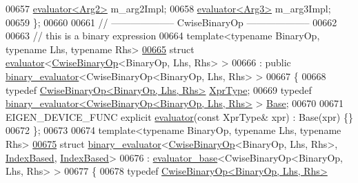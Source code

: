 \begin{DoxyCode}
00657   \hyperlink{struct_eigen_1_1internal_1_1evaluator}{evaluator<Arg2>} m\_arg2Impl;
00658   \hyperlink{struct_eigen_1_1internal_1_1evaluator}{evaluator<Arg3>} m\_arg3Impl;
00659 \};
00660 
00661 \textcolor{comment}{// -------------------- CwiseBinaryOp --------------------}
00662 
00663 \textcolor{comment}{// this is a binary expression}
00664 \textcolor{keyword}{template}<\textcolor{keyword}{typename} BinaryOp, \textcolor{keyword}{typename} Lhs, \textcolor{keyword}{typename} Rhs>
\hyperlink{struct_eigen_1_1internal_1_1evaluator_3_01_cwise_binary_op_3_01_binary_op_00_01_lhs_00_01_rhs_01_4_01_4}{00665} \textcolor{keyword}{struct }\hyperlink{struct_eigen_1_1internal_1_1evaluator}{evaluator}<\hyperlink{group___core___module_class_eigen_1_1_cwise_binary_op}{CwiseBinaryOp}<BinaryOp, Lhs, Rhs> >
00666   : \textcolor{keyword}{public} \hyperlink{struct_eigen_1_1internal_1_1binary__evaluator}{binary\_evaluator}<CwiseBinaryOp<BinaryOp, Lhs, Rhs> >
00667 \{
00668   \textcolor{keyword}{typedef} \hyperlink{group___core___module_class_eigen_1_1_cwise_binary_op}{CwiseBinaryOp<BinaryOp, Lhs, Rhs>} 
      \hyperlink{group___core___module_class_eigen_1_1_cwise_binary_op}{XprType};
00669   \textcolor{keyword}{typedef} \hyperlink{struct_eigen_1_1internal_1_1binary__evaluator}{binary\_evaluator<CwiseBinaryOp<BinaryOp, Lhs, Rhs>}
       > \hyperlink{struct_eigen_1_1internal_1_1binary__evaluator}{Base};
00670   
00671   EIGEN\_DEVICE\_FUNC \textcolor{keyword}{explicit} \hyperlink{struct_eigen_1_1internal_1_1evaluator}{evaluator}(\textcolor{keyword}{const} XprType& xpr) : Base(xpr) \{\}
00672 \};
00673 
00674 \textcolor{keyword}{template}<\textcolor{keyword}{typename} BinaryOp, \textcolor{keyword}{typename} Lhs, \textcolor{keyword}{typename} Rhs>
\hyperlink{struct_eigen_1_1internal_1_1binary__evaluator_3_01_cwise_binary_op_3_01_binary_op_00_01_lhs_00_009c1543c08828196fc8ade7d79a56c66}{00675} \textcolor{keyword}{struct }\hyperlink{struct_eigen_1_1internal_1_1binary__evaluator}{binary\_evaluator}<\hyperlink{group___core___module_class_eigen_1_1_cwise_binary_op}{CwiseBinaryOp}<BinaryOp, Lhs, Rhs>, 
      \hyperlink{struct_eigen_1_1internal_1_1_index_based}{IndexBased}, \hyperlink{struct_eigen_1_1internal_1_1_index_based}{IndexBased}>
00676   : \hyperlink{struct_eigen_1_1internal_1_1evaluator__base}{evaluator\_base}<CwiseBinaryOp<BinaryOp, Lhs, Rhs> >
00677 \{
00678   \textcolor{keyword}{typedef} \hyperlink{group___core___module_class_eigen_1_1_cwise_binary_op}{CwiseBinaryOp<BinaryOp, Lhs, Rhs>} 

\end{DoxyCode}
